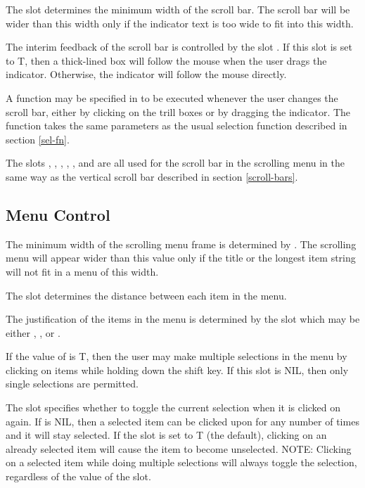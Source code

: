 The slot  determines the minimum width of
the scroll bar.  The scroll bar will be wider than this width only if
the indicator text is too wide to fit into this width.

The interim feedback of the scroll bar is controlled by the slot
.  If this slot is set to T, then a
thick-lined box will follow the mouse when the user drags the
indicator.  Otherwise, the indicator will follow the mouse directly.

A function may be specified in  to be
executed whenever the user changes the scroll bar, either by clicking
on the trill boxes or by dragging the indicator.  The function takes
the same parameters as the usual selection function described in
section \ref{sel-fn}.

The slots , , ,
, , and  are
all used for the scroll bar in the scrolling menu in the same way as
the vertical scroll bar described in section \ref{scroll-bars}.

\subsection{Menu Control} The minimum width of the scrolling menu
frame is determined by .  The scrolling menu will
appear wider than this value only if the title or the longest item
string will not fit in a menu of this width.

The  slot determines the distance between each item in
the menu.

The justification of the items in the menu is determined by the slot
 which may be either , , or
.

If the value of  is T, then the user may make multiple
selections in the menu by clicking on items while holding down the
shift key.  If this slot is NIL, then only single selections are
permitted.

The  slot specifies whether to toggle the current selection when
it is clicked on again.  If  is NIL, then a selected item can
be clicked upon for any number of times and it will stay selected.  If the
 slot is set to T (the default), clicking on an already selected
item will cause the item to become unselected.  NOTE: Clicking on a selected
item while doing multiple selections will always toggle the selection,
regardless of the value of the  slot.

